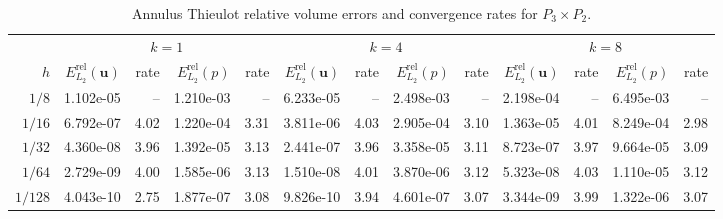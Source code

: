 \documentclass[10pt,a4paper]{article}
\begin{document}
\begin{table}[p]
\centering
\caption{Annulus Thieulot relative volume errors and convergence rates for $P_3\times P_2$.}
\label{tab:annulus_thieulot_v3_p2_cont}
\small
\begin{tabular}{
r rr rr rr rr rr rr
}
\toprule
& \multicolumn{4}{c}{$k=1$} & \multicolumn{4}{c}{$k=4$} & \multicolumn{4}{c}{$k=8$} \\
\cmidrule(lr){2-5}\cmidrule(lr){6-9}\cmidrule(lr){10-13}
$h$ & $E_{L_2}^{\mathrm{rel}}(\mathbf{u})$ & rate & $E_{L_2}^{\mathrm{rel}}(p)$ & rate & $E_{L_2}^{\mathrm{rel}}(\mathbf{u})$ & rate & $E_{L_2}^{\mathrm{rel}}(p)$ & rate & $E_{L_2}^{\mathrm{rel}}(\mathbf{u})$ & rate & $E_{L_2}^{\mathrm{rel}}(p)$ & rate \\
\midrule
$1/8$ & 1.102e-05 & -- & 1.210e-03 & -- & 6.233e-05 & -- & 2.498e-03 & -- & 2.198e-04 & -- & 6.495e-03 & -- \\
$1/16$ & 6.792e-07 & 4.02 & 1.220e-04 & 3.31 & 3.811e-06 & 4.03 & 2.905e-04 & 3.10 & 1.363e-05 & 4.01 & 8.249e-04 & 2.98 \\
$1/32$ & 4.360e-08 & 3.96 & 1.392e-05 & 3.13 & 2.441e-07 & 3.96 & 3.358e-05 & 3.11 & 8.723e-07 & 3.97 & 9.664e-05 & 3.09 \\
$1/64$ & 2.729e-09 & 4.00 & 1.585e-06 & 3.13 & 1.510e-08 & 4.01 & 3.870e-06 & 3.12 & 5.323e-08 & 4.03 & 1.110e-05 & 3.12 \\
$1/128$ & 4.043e-10 & 2.75 & 1.877e-07 & 3.08 & 9.826e-10 & 3.94 & 4.601e-07 & 3.07 & 3.344e-09 & 3.99 & 1.322e-06 & 3.07 \\
\bottomrule
\end{tabular}
\end{table}
\end{document}
